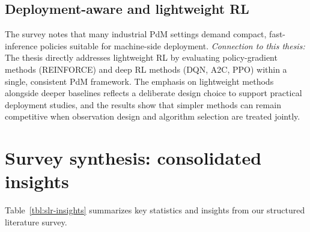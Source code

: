 \documentclass[12pt,oneside]{book}
\begin{document}
\subsection{Deployment-aware and lightweight RL}
The survey notes that many industrial PdM settings demand compact, fast-inference policies suitable for machine-side deployment. \textit{Connection to this thesis:} The thesis directly addresses lightweight RL by evaluating policy-gradient methods (\textsc{REINFORCE}) and deep RL methods (\textsc{DQN}, \textsc{A2C}, \textsc{PPO}) within a single, consistent PdM framework. The emphasis on lightweight methods alongside deeper baselines reflects a deliberate design choice to support practical deployment studies, and the results show that simpler methods can remain competitive when observation design and algorithm selection are treated jointly.

\section{Survey synthesis: consolidated insights}
Table~\ref{tbl:slr-insights} summarizes key statistics and insights from our structured literature survey.
\end{document}
